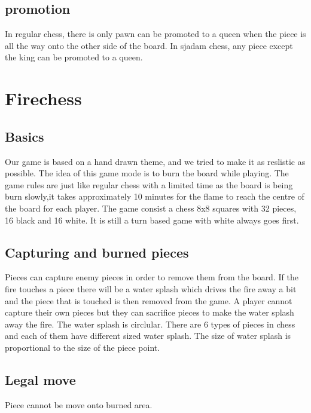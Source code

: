\documentclass{article}
\begin{document}
\subsection*{promotion}

In regular chess, there is only pawn can be promoted to a queen when the piece is all the way onto the other side of the board. In sjadam chess, any piece except the king can be promoted to a queen. 


\section*{Firechess}
\subsection*{Basics}

Our game is based on a hand drawn theme, and we tried to make it as reslistic as possible. The idea of this game mode is to burn the board while playing. The game rules are just like regular chess with a limited time as the board is being burn slowly,it takes approximately 10 minutes for the flame to reach the centre of the board for each player. The game consist a chess 8x8 squares with 32 pieces, 16 black and 16 white. It is still a turn based game with white always goes first. 


\subsection*{Capturing and burned pieces}

Pieces can capture enemy pieces in order to remove them from the board. If the fire touches a piece there will be a water splash which drives the fire away a bit and the piece that is touched is then removed from the game. A player cannot capture their own pieces but they can sacrifice pieces to make the water splash away the fire. The water splash is circlular. There are 6 types of pieces in chess and each of them have different sized water splash. The size of water splash is proportional to the size of the piece point. 

\subsection*{Legal move}

Piece cannot be move onto burned area. 




 
\end{document}
